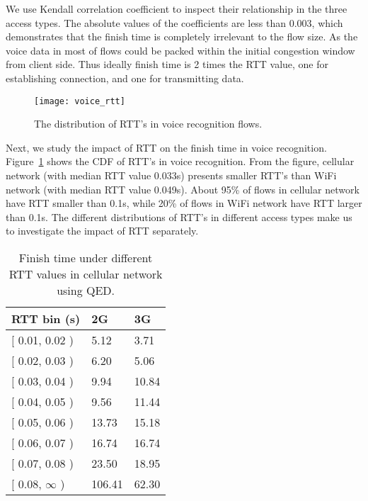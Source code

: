We use Kendall correlation coefficient to inspect their relationship in the three access types. The absolute values of the coefficients are less than 0.003, which demonstrates that the finish time is completely irrelevant to the flow size. As the voice data in most of flows could be packed within the initial congestion window from client side. Thus ideally finish time is 2 times the RTT value, one for establishing connection, and one for transmitting data.

\begin{figure}[th]
\centering
	\texttt{[image: voice\_rtt]}
\caption{The distribution of RTT's in voice recognition flows.}
\label{fig:voice_rtt}
\end{figure}

Next, we study the impact of RTT on the finish time in voice recognition. Figure~\ref{fig:voice_rtt} shows the CDF of RTT's in voice recognition. From the figure, cellular network (with median RTT value 0.033s) presents smaller RTT's than WiFi network (with median RTT value 0.049s). About 95\% of flows in cellular network have RTT smaller than 0.1s, while 20\% of flows in WiFi network have RTT larger than 0.1s. The different distributions of RTT's in different access types make us to investigate the impact of RTT separately.

\begin{table}[th]
\caption{Finish time under different RTT values in cellular network using QED.}
\label{tab:voice_celluar_qed_rtt}
\centering
\renewcommand{\arraystretch}{1.2}
\begin{tabular}{l|m{.35in}|m{.35in}}
	\toprule
	RTT bin (s) & 2G & 3G \\
	\midrule
	$[$ 0.01, 0.02 ) & 5.12 & 3.71 \\
	\hline
	$[$ 0.02, 0.03 ) & 6.20 & 5.06 \\
	\hline 
	$[$ 0.03, 0.04 ) & 9.94 & 10.84 \\
	\hline 
	$[$ 0.04, 0.05 ) & 9.56 & 11.44 \\
	\hline 
	$[$ 0.05, 0.06 ) & 13.73 & 15.18 \\
	\hline 
	$[$ 0.06, 0.07 ) & 16.74 & 16.74 \\
	\hline 
	$[$ 0.07, 0.08 ) & 23.50 & 18.95 \\
	\hline 
	$[$ 0.08, $\infty$ ) & 106.41 & 62.30 \\
	\bottomrule
\end{tabular}
\end{table}

